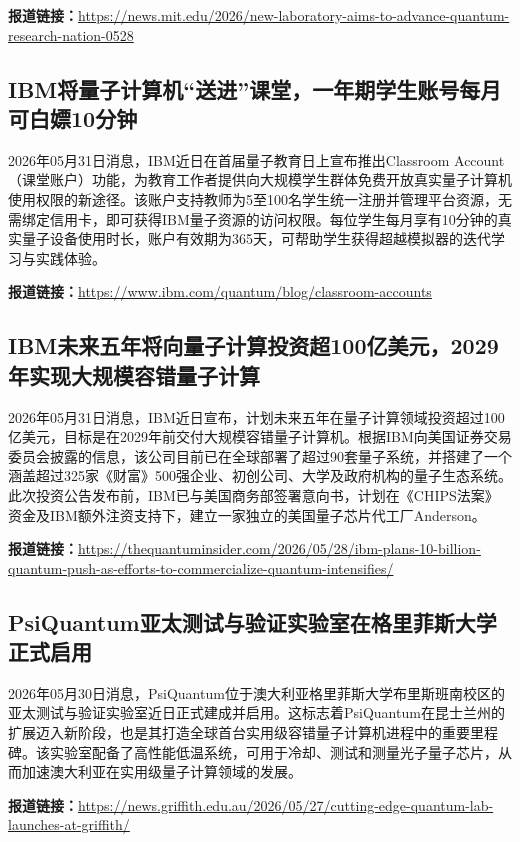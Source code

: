 \documentclass[12pt,a4paper]{ctexart}
\begin{document}
\noindent\textbf{报道链接：}\url{https://news.mit.edu/2026/new-laboratory-aims-to-advance-quantum-research-nation-0528}

\subsection{ IBM将量子计算机“送进”课堂，一年期学生账号每月可白嫖10分钟 }

2026年05月31日消息，IBM近日在首届量子教育日上宣布推出Classroom Account（课堂账户）功能，为教育工作者提供向大规模学生群体免费开放真实量子计算机使用权限的新途径。该账户支持教师为5至100名学生统一注册并管理平台资源，无需绑定信用卡，即可获得IBM量子资源的访问权限。每位学生每月享有10分钟的真实量子设备使用时长，账户有效期为365天，可帮助学生获得超越模拟器的迭代学习与实践体验。

\noindent\textbf{报道链接：}\url{https://www.ibm.com/quantum/blog/classroom-accounts}

\subsection{ IBM未来五年将向量子计算投资超100亿美元，2029年实现大规模容错量子计算 }

2026年05月31日消息，IBM近日宣布，计划未来五年在量子计算领域投资超过100亿美元，目标是在2029年前交付大规模容错量子计算机。根据IBM向美国证券交易委员会披露的信息，该公司目前已在全球部署了超过90套量子系统，并搭建了一个涵盖超过325家《财富》500强企业、初创公司、大学及政府机构的量子生态系统。此次投资公告发布前，IBM已与美国商务部签署意向书，计划在《CHIPS法案》资金及IBM额外注资支持下，建立一家独立的美国量子芯片代工厂Anderson。

\noindent\textbf{报道链接：}\url{https://thequantuminsider.com/2026/05/28/ibm-plans-10-billion-quantum-push-as-efforts-to-commercialize-quantum-intensifies/}

\subsection{ PsiQuantum亚太测试与验证实验室在格里菲斯大学正式启用 }

2026年05月30日消息，PsiQuantum位于澳大利亚格里菲斯大学布里斯班南校区的亚太测试与验证实验室近日正式建成并启用。这标志着PsiQuantum在昆士兰州的扩展迈入新阶段，也是其打造全球首台实用级容错量子计算机进程中的重要里程碑。该实验室配备了高性能低温系统，可用于冷却、测试和测量光子量子芯片，从而加速澳大利亚在实用级量子计算领域的发展。

\noindent\textbf{报道链接：}\url{https://news.griffith.edu.au/2026/05/27/cutting-edge-quantum-lab-launches-at-griffith/}
\end{document}
